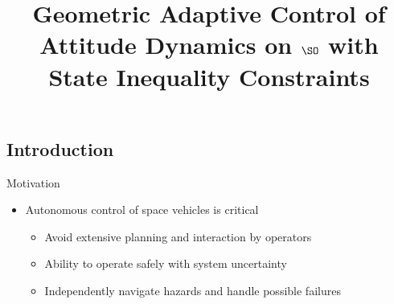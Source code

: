 \documentclass[11pt,professionalfonts]{beamer}
\title[2016 SSPI]{\large\bf  Geometric Adaptive Control of Attitude Dynamics on \(\SO \) with State Inequality Constraints}
\author{\vspace*{-0.3cm}}
\institute{
	\footnotesize
	{\normalsize\bf{Shankar Kulumani and Christopher Poole}}\\
	\vspace*{0.2cm}
  	\textbf{Flight Dynamics \& Control Lab}\\ \vspace*{0.5cm}
 	\begin{figure} %
       	\texttt{[image: gw\_txh\_2cs\_pos]}
  	\end{figure}
}
\date{}
\begin{document}

\setcounter{framenumber}{-1}
\begin{frame} %
  \titlepage
\end{frame}   %

\section*{}
\subsection*{Introduction}  

\begin{frame}[t]{Motivation} %
\begin{itemize}
	\item Autonomous control of space vehicles is critical
	\begin{itemize}
		\item Avoid extensive planning and interaction by operators
		\item Ability to operate safely with system uncertainty 
		\item Independently navigate hazards and handle possible failures
	\end{itemize}
\end{itemize}
\end{frame}   %
\end{document}
